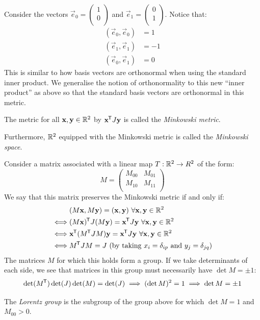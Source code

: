 \documentclass[../main.tex]{subfiles}
\begin{document}
Consider the vectors $\vec{e}_0 = \begin{pmatrix}
1 \\
0 \\
\end{pmatrix}$ and $\vec{e}_1 = \begin{pmatrix}
0 \\
1 \\
\end{pmatrix}$.
Notice that:
\begin{align*}
  (\vec{e}_0, \vec{e}_0) &= 1 \\
  (\vec{e}_1, \vec{e}_1) &= -1 \\
  (\vec{e}_0, \vec{e}_1) & = 0
\end{align*}
This is similar to how basis vectors are orthonormal when using the standard inner product.
We generalise the notion of orthonormality to this new ``inner product'' as above so that the standard basis vectors are orthonormal in this metric.
\begin{definition}
  The metric for all $\mathbf{\bm{x}}, \mathbf{\bm{y}} \in \mathbb{R}^2$ by $\mathbf{\bm{x}}^{{\mkern-1.5mu\mathsf{T}}}J\mathbf{\bm{y}}$ is called the \textit{Minkowski metric}.

  Furthermore, $\mathbb{R}^2$ equipped with the Minkowski metric is called the \textit{Minkowski space}.
\end{definition}
Consider a matrix associated with a linear map $T: \mathbb{R}^2 \to R^2$ of the form:
\[
  M = \begin{pmatrix}
  M_{0 0} & M_{0 1} \\
  M_{1 0} & M_{1 1} \\
  \end{pmatrix}
\]
We say that this matrix preserves the Minkowski metric if and only if:
\begin{align*}
  &(M\vec{x}, M\vec{y}) = (\vec{x}, \vec{y})\ \forall \vec{x}, \vec{y} \in \R^2 \\
  \iff& (M\vec{x})^{\trans}J(M\vec{y}) = \vec{x}^{\trans}J\vec{y} \ \forall \vec{x}, \vec{y} \in \R^2 \\
  \iff& \vec{x}^{\trans}(M^{\trans}JM)\vec{y} = \vec{x}^{\trans}J\vec{y} \ \forall \vec{x}, \vec{y} \in \R^2 \\
  \iff& M^{\trans}JM = J \text{ (by taking $x_i = \delta_{i p}$ and $y_j = \delta_{j q}$)}
\end{align*}
The matrices $M$ for which this holds form a group.
If we take determinants of each side, we see that matrices in this group must necessarily have $\det M = \pm 1$:
\[
  \det (M^{{\mkern-1.5mu\mathsf{T}}})\det(J)\det(M) = \det(J) \implies (\det M)^2 = 1 \implies \det M = \pm 1
\]
\begin{definition}
  The \textit{Lorentz group} is the subgroup of the group above for which $\det M = 1$ and $M_{0 0} > 0$.
\end{definition}
\end{document}
